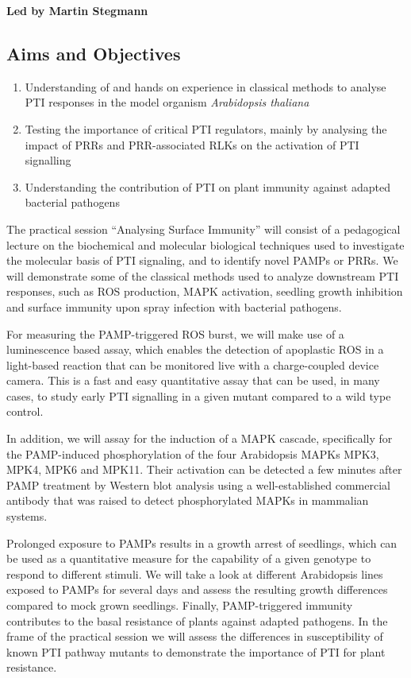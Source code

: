 \documentclass[12pt,]{book}
\providecommand{\tightlist}{%
  \setlength{\itemsep}{0pt}\setlength{\parskip}{0pt}}
\begin{document}
\textbf{Led by Martin Stegmann}

\subsection*{Aims and Objectives}\label{aims-and-objectives-3}

\begin{enumerate}
\def\labelenumi{\arabic{enumi}.}
\tightlist
\item
  Understanding of and hands on experience in classical methods to
  analyse PTI responses in the model organism \emph{Arabidopsis
  thaliana}
\item
  Testing the importance of critical PTI regulators, mainly by analysing
  the impact of PRRs and PRR-associated RLKs on the activation of PTI
  signalling
\item
  Understanding the contribution of PTI on plant immunity against
  adapted bacterial pathogens
\end{enumerate}

The practical session ``Analysing Surface Immunity'' will consist of a
pedagogical lecture on the biochemical and molecular biological
techniques used to investigate the molecular basis of PTI signaling, and
to identify novel PAMPs or PRRs. We will demonstrate some of the
classical methods used to analyze downstream PTI responses, such as ROS
production, MAPK activation, seedling growth inhibition and surface
immunity upon spray infection with bacterial pathogens.

For measuring the PAMP-triggered ROS burst, we will make use of a
luminescence based assay, which enables the detection of apoplastic ROS
in a light-based reaction that can be monitored live with a
charge-coupled device camera. This is a fast and easy quantitative assay
that can be used, in many cases, to study early PTI signalling in a
given mutant compared to a wild type control.

In addition, we will assay for the induction of a MAPK cascade,
specifically for the PAMP-induced phosphorylation of the four
Arabidopsis MAPKs MPK3, MPK4, MPK6 and MPK11. Their activation can be
detected a few minutes after PAMP treatment by Western blot analysis
using a well-established commercial antibody that was raised to detect
phosphorylated MAPKs in mammalian systems.

Prolonged exposure to PAMPs results in a growth arrest of seedlings,
which can be used as a quantitative measure for the capability of a
given genotype to respond to different stimuli. We will take a look at
different Arabidopsis lines exposed to PAMPs for several days and assess
the resulting growth differences compared to mock grown seedlings.
Finally, PAMP-triggered immunity contributes to the basal resistance of
plants against adapted pathogens. In the frame of the practical session
we will assess the differences in susceptibility of known PTI pathway
mutants to demonstrate the importance of PTI for plant resistance.
\end{document}
